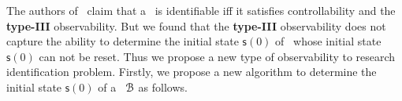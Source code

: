 The authors of~\cite{Cheng2011Identification} claim that a \BCN\ is identifiable iff it satisfies controllability and the {\bf type-III} observability. But we found that the {\bf type-III} observability does not capture the ability to determine the initial state $\mathsf{s}(0)$ of \BCN\ whose initial state $\mathsf{s}(0)$ can not be reset. Thus we propose a new type of observability to research identification problem. Firstly, we propose a new algorithm to determine the initial state $\mathsf{s}(0)$ of a \BCN\ ${\mathcal{B}}$ as follows.




 
 



%










